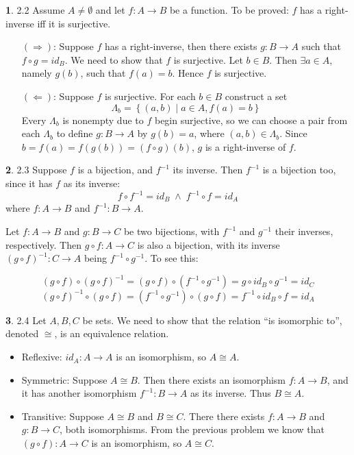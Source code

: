 \documentclass{article}
\theoremstyle{definition}
\newcommand{\AND}{\;\wedge\;}
\newcommand{\set}[1]{\left\{#1\right\}}
\theoremstyle{definition}
\theoremstyle{definition}
\newtheorem{solution-internal}{}[subsection]
\newenvironment{solution}{
  \medskip
  \begin{solution-internal}
}{
  \end{solution-internal}
}
\begin{document}
\begin{solution}
2.2 Assume $A \neq \emptyset$ and let $f \colon A \to B$ be a function. To be proved: $f$ has a right-inverse iff it is surjective.
\begin{itemize}
  \item[$(\Rightarrow)$:] Suppose $f$ has a right-inverse, then there exists $g \colon B \to A$ such that $f \circ g = id_B$. We need to show that $f$ is surjective. Let $b \in B$. Then $\exists a \in A$, namely $g(b)$, such that $f(a) = b$. Hence $f$ is surjective.
\item[$(\Leftarrow)$:] Suppose $f$ is surjective. For each $b \in B$ construct a set
\[ \Lambda_b = \set{(a,b) \mid a \in A, f(a) = b} \]
Every $\Lambda_b$ is nonempty due to $f$ begin surjective, so we can choose a
pair from each $\Lambda_b$ to define $g \colon B \to A$ by $g(b) = a$, where
$(a,b) \in \Lambda_b$. Since $b = f(a) = f(g(b)) = (f \circ g)(b)$, $g$ is a
right-inverse of $f$.
\end{itemize}
\end{solution}

\begin{solution}
2.3 Suppose $f$ is a bijection, and $f^{-1}$ its inverse. Then $f^{-1}$ is a bijection too, since it has $f$ as its inverse: 
\[f \circ f^{-1} = id_B \AND f^{-1} \circ f = id_A \]
where $f \colon A \to B$ and $f^{-1} \colon B \to A$.
\end{solution}
Let $f\colon A \to B$ and $g\colon B \to C$ be two bijections, with $f^{-1}$
and $g^{-1}$ their inverses, respectively. Then $g \circ f \colon A \to C$ is
also a bijection, with its inverse $(g\circ f)^{-1}\colon C \to A$ being $f^{-1} \circ g^{-1}$. To see this:

\[(g \circ f)\circ {(g\circ f)}^{-1} = (g\circ f) \circ (f^{-1}\circ g^{-1}) = g \circ id_B \circ g^{-1} = id_C \]
\[{(g\circ f)}^{-1}\circ (g \circ f) = (f^{-1}\circ g^{-1}) \circ (g\circ f) = f^{-1} \circ id_B \circ f = id_A \]

\begin{solution}
2.4 Let $A,B,C$ be sets. We need to show that the relation ``is isomorphic
to'', denoted $\cong$, is an equivalence relation.
\begin{itemize}
\item Reflexive: $id_A\colon A \to A$ is an isomorphism, so $A\cong A$.
\item Symmetric: Suppose $A \cong B$. Then there exists an isomorphism $f\colon A \to B$, and it has another isomorphism $f^{-1}\colon B \to A$ as its inverse. Thus $B\cong A$.
\item Transitive: Suppose $A\cong B$ and $B\cong C$. There there exists $f\colon A \to B$ and $g\colon B \to C$, both isomorphisms. From the previous problem we know that $(g \circ f)\colon A \to C$ is an isomorphism, so $A \cong C$.
\end{itemize}
\end{solution}
\end{document}
